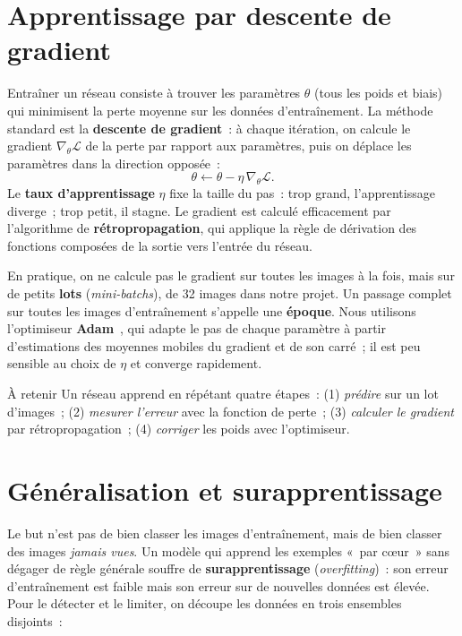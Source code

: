 \section{Apprentissage par descente de gradient}

Entraîner un réseau consiste à trouver les paramètres $\theta$ (tous les poids et biais) qui minimisent la perte moyenne sur les données d’entraînement. La méthode standard est la \textbf{descente de gradient}~: à chaque itération, on calcule le gradient $\nabla_\theta\mathcal{L}$ de la perte par rapport aux paramètres, puis on déplace les paramètres dans la direction opposée~:
\begin{equation}
  \theta \leftarrow \theta - \eta\,\nabla_\theta \mathcal{L}.
\end{equation}
Le \textbf{taux d’apprentissage} $\eta$ fixe la taille du pas~: trop grand, l’apprentissage diverge~; trop petit, il stagne. Le gradient est calculé efficacement par l’algorithme de \textbf{rétropropagation}, qui applique la règle de dérivation des fonctions composées de la sortie vers l’entrée du réseau.

En pratique, on ne calcule pas le gradient sur toutes les images à la fois, mais sur de petits \textbf{lots} (\emph{mini-batchs}), de 32 images dans notre projet. Un passage complet sur toutes les images d’entraînement s’appelle une \textbf{époque}. Nous utilisons l’optimiseur \textbf{Adam}~\cite{kingma2015}, qui adapte le pas de chaque paramètre à partir d’estimations des moyennes mobiles du gradient et de son carré~; il est peu sensible au choix de $\eta$ et converge rapidement.

\begin{defbox}{À retenir}
Un réseau apprend en répétant quatre étapes~: (1) \emph{prédire} sur un lot d’images~; (2) \emph{mesurer l’erreur} avec la fonction de perte~; (3) \emph{calculer le gradient} par rétropropagation~; (4) \emph{corriger} les poids avec l’optimiseur.
\end{defbox}

\section{Généralisation et surapprentissage}

Le but n’est pas de bien classer les images d’entraînement, mais de bien classer des images \emph{jamais vues}. Un modèle qui apprend les exemples «~par cœur~» sans dégager de règle générale souffre de \textbf{surapprentissage} (\emph{overfitting})~: son erreur d’entraînement est faible mais son erreur sur de nouvelles données est élevée. Pour le détecter et le limiter, on découpe les données en trois ensembles disjoints~:

